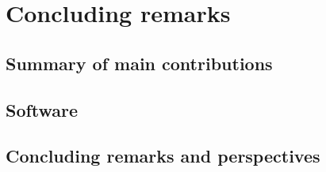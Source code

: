 \chapter{Concluding remarks}

\section{Summary of main contributions}
\section{Software}
\section{Concluding remarks and perspectives}



